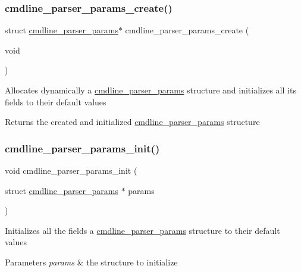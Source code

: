 \subsubsection{\texorpdfstring{cmdline\+\_\+parser\+\_\+params\+\_\+create()}{cmdline\_parser\_params\_create()}}
{\footnotesize\ttfamily struct \hyperlink{structcmdline__parser__params}{cmdline\+\_\+parser\+\_\+params}$\ast$ cmdline\+\_\+parser\+\_\+params\+\_\+create (\begin{DoxyParamCaption}\item[{void}]{ }\end{DoxyParamCaption})}

Allocates dynamically a \hyperlink{structcmdline__parser__params}{cmdline\+\_\+parser\+\_\+params} structure and initializes all its fields to their default values \begin{DoxyReturn}{Returns}
the created and initialized \hyperlink{structcmdline__parser__params}{cmdline\+\_\+parser\+\_\+params} structure 
\end{DoxyReturn}
\mbox{\label{des-getopt_8h_af72b814611cffc706b2135ccdfe7e997}} 
\subsubsection{\texorpdfstring{cmdline\+\_\+parser\+\_\+params\+\_\+init()}{cmdline\_parser\_params\_init()}}
{\footnotesize\ttfamily void cmdline\+\_\+parser\+\_\+params\+\_\+init (\begin{DoxyParamCaption}\item[{struct \hyperlink{structcmdline__parser__params}{cmdline\+\_\+parser\+\_\+params} $\ast$}]{params }\end{DoxyParamCaption})}

Initializes all the fields a \hyperlink{structcmdline__parser__params}{cmdline\+\_\+parser\+\_\+params} structure to their default values 
\begin{DoxyParams}{Parameters}
{\em params} & the structure to initialize \\
\hline
\end{DoxyParams}
\mbox{\label{des-getopt_8h_ad4f7db2fa4002379eb30e5206f3b7492}} 
